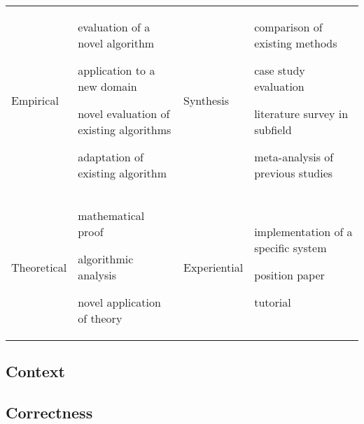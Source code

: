\documentclass[oneside]{article} %
\begin{document}
\begin{center}
\begin{tabular}{ p{1.5cm} p{6.5cm} p{1.5cm} p{6.5cm}}
 Empirical & \begin{checklist}
 \item evaluation of a novel algorithm
 \item application to a new domain
 \item novel evaluation of existing algorithms
 \item adaptation of existing algorithm
 \end{checklist}&
 Synthesis & \begin{checklist}
 \item comparison of existing methods
 \item case study evaluation
 \item literature survey in subfield
 \item meta-analysis of previous studies
 \end{checklist} \\
Theoretical & \begin{checklist}
\item mathematical proof
\item algorithmic analysis
\item novel application of theory
 \end{checklist} &
Experiential & \begin{checklist}
 \item implementation of a specific system
 \item position paper
 \item tutorial
 \end{checklist}\\
 \end{tabular}
 \end{center}
 
\subsection*{Context}
\label{sec:context}




\subsection*{Correctness}
\label{sec:corr}
\end{document}
